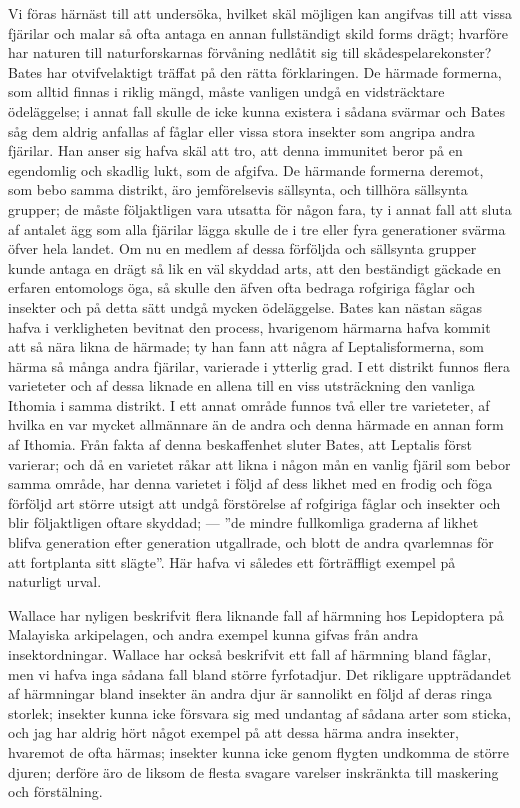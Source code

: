 Vi föras härnäst till att undersöka, hvilket skäl möjligen kan angifvas till att vissa fjärilar och malar så ofta antaga en annan fullständigt skild forms drägt; hvarföre har naturen till naturforskarnas förvåning nedlåtit sig till skådespelarekonster? Bates har otvifvelaktigt träffat på den rätta förklaringen. De härmade formerna, som alltid finnas i riklig mängd, måste vanligen undgå en vidsträcktare ödeläggelse; i annat fall skulle de icke kunna existera i sådana svärmar och Bates såg dem aldrig anfallas af fåglar eller vissa stora insekter som angripa andra fjärilar. Han anser sig hafva skäl att tro, att denna immunitet beror på en egendomlig och skadlig lukt, som de afgifva. De härmande formerna deremot, som bebo samma distrikt, äro jemförelsevis sällsynta, och tillhöra sällsynta grupper; de måste följaktligen vara utsatta för någon fara, ty i annat fall att sluta af antalet ägg som alla fjärilar lägga skulle de i tre eller fyra generationer svärma öfver hela landet. Om nu en medlem af dessa förföljda och sällsynta grupper kunde antaga en drägt så lik en väl skyddad arts, att den beständigt gäckade en erfaren entomologs öga, så skulle den äfven ofta bedraga rofgiriga fåglar och insekter och på detta sätt undgå mycken ödeläggelse. Bates kan nästan sägas hafva i verkligheten bevitnat den process, hvarigenom härmarna hafva kommit att så nära likna de härmade; ty han fann att några af Leptalisformerna, som härma så många andra fjärilar, varierade i ytterlig grad. I ett distrikt funnos flera varieteter och af dessa liknade en allena till en viss utsträckning den vanliga Ithomia i samma distrikt. I ett annat område funnos två eller tre varieteter, af hvilka en var mycket allmännare än de andra och denna härmade en annan form af Ithomia. Från fakta af denna beskaffenhet sluter Bates, att Leptalis först varierar; och då en varietet råkar att likna i någon mån en vanlig fjäril som bebor samma område, har denna varietet i följd af dess likhet med en frodig och föga förföljd art större utsigt att undgå förstörelse af rofgiriga fåglar och insekter och blir följaktligen oftare skyddad; — ”de mindre fullkomliga graderna af likhet blifva generation efter generation utgallrade, och blott de andra qvarlemnas för att fortplanta sitt slägte”. Här hafva vi således ett förträffligt exempel på naturligt urval.

Wallace har nyligen beskrifvit flera liknande fall af härmning hos Lepidoptera på Malayiska arkipelagen, och andra exempel kunna gifvas från andra insektordningar. Wallace har också beskrifvit ett fall af härmning bland fåglar, men vi hafva inga sådana fall bland större fyrfotadjur. Det rikligare uppträdandet af härmningar bland insekter än andra djur är sannolikt en följd af deras ringa storlek; insekter kunna icke försvara sig med undantag af sådana arter som sticka, och jag har aldrig hört något exempel på att dessa härma andra insekter, hvaremot de ofta härmas; insekter kunna icke genom flygten undkomma de större djuren; derföre äro de liksom de flesta svagare varelser inskränkta till maskering och förstälning.

